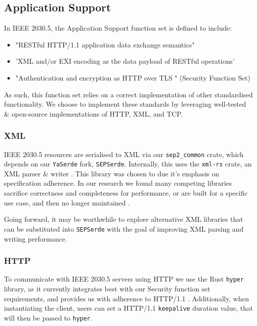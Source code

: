 \subsection{Application Support}
In IEEE 2030.5, the Application Support function set is defined to include:

\begin{itemize}
    \item "RESTful HTTP/1.1 application data exchange semantics"
    \item 'XML and/or EXI encoding as the data payload of RESTful operations'
    \item "Authentication and encryption as HTTP over TLS " (Security Function Set)
\end{itemize}

\cite{IEEE2030.5}

As such, this function set relies on a correct implementation of other standardised functionality. We choose to implement these standards by leveraging well-tested \& open-source implementations of HTTP, XML, and TCP.

\subsubsection{XML}
IEEE 2030.5 resources are serialised to XML via our \texttt{sep2\_common} crate, which depends on our \texttt{YaSerde} fork, \texttt{SEPSerde}. Internally, this uses the \texttt{xml-rs} crate, an XML parser \& writer \cite{xmlrs}. This library was chosen to due it's emphasis on specification adherence. In our research we found many competing libraries sacrifice correctness and completeness for performance, or are built for a specific use case, and then no longer maintained \cite{xmlrsperformance}.

Going forward, it may be worthwhile to explore alternative XML libraries that can be substituted into \texttt{SEPSerde} with the goal of improving XML parsing and writing performance. 

\subsubsection{HTTP}
To communicate with IEEE 2030.5 servers using HTTP we use the Rust \texttt{hyper} library, as it currently integrates best with our Security function set requirements, and provides us with adherence to HTTP/1.1 \cite{hyper}. 
Additionally, when instantiating the client, users can set a HTTP/1.1 \texttt{keepalive} duration value, that will then be passed to \texttt{hyper}.

